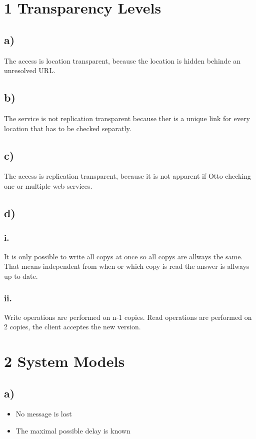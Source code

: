 \documentclass{scrartcl}
\author{Felix Bühler\\2973410 \and Clemens Lieb\\xxxxxxx \and Steffen Wonner\\2862123 \and Fabian Bühler\\2953320}
\title{\gettitle}
\subtitle{\getsubtitle}
\begin{document}
\maketitle

\section*{1 Transparency Levels}
\subsection*{a)}
The access is location transparent, because the location is hidden behinde an unresolved URL.
\subsection*{b)}
The service is not replication transparent because ther is a unique link for every location that has to be checked separatly.
\subsection*{c)}
The access is replication transparent, because it is not apparent if Otto checking one or multiple web services.
\subsection*{d)}
\subsubsection*{i.}
It is only possible to write all copys at once so all copys are allways the same. That means independent from when or which copy is read the answer is allways up to date.
\subsubsection*{ii.}
Write operations are performed on n-1 copies.
Read operations are performed on 2 copies, the client acceptes the new version.

\section*{2 System Models}
\subsection*{a)}
\begin{itemize}
	\item No message is lost
	\item The maximal possible delay is known
\end{itemize}
\end{document}
